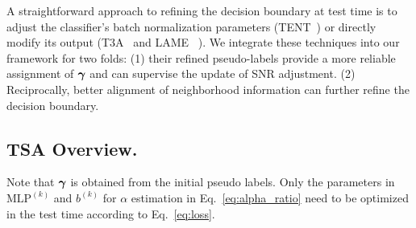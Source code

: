 A straightforward approach to refining the decision boundary at test time is to adjust the classifier's batch normalization parameters (TENT~\cite{wang2020tent}) or directly modify its output (T3A~\cite{iwasawa2021test} and LAME~ \cite{boudiaf2022parameter}). 
We integrate these techniques into our framework for two folds: (1) their refined pseudo-labels provide a more reliable assignment of $\boldsymbol{\gamma}$ and can supervise the update of SNR adjustment. (2) Reciprocally, better alignment of neighborhood information can further refine the decision boundary.









\subsection{TSA Overview.}
\label{Sec:overview}
Note that $\boldsymbol{\gamma}$ is obtained from the initial pseudo labels.
Only the parameters in $\text{MLP}^{(k)}$ and $b^{(k)}$ for $\alpha$ estimation in Eq.~\ref{eq:alpha_ratio} need to be optimized in the test time according to Eq.~\ref{eq:loss}.

